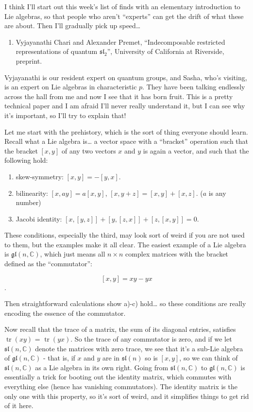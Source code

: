 \documentclass{article}
\def\tightlist{}
\begin{document}
I think I'll start out this week's list of finds with an elementary
introduction to Lie algebras, so that people who aren't ``experts'' can
get the drift of what these are about. Then I'll gradually pick up
speed\ldots{}

\begin{enumerate}
\def\labelenumi{\arabic{enumi})}
\tightlist
\item
  Vyjayanathi Chari and Alexander Premet, ``Indecomposable restricted
  representations of quantum \(\mathfrak{sl}_2\)'', University of
  California at Riverside, preprint.
\end{enumerate}

Vyjayanathi is our resident expert on quantum groups, and Sasha, who's
visiting, is an expert on Lie algebras in characteristic \(p\). They
have been talking endlessly across the hall from me and now I see that
it has born fruit. This is a pretty technical paper and I am afraid I'll
never really understand it, but I can see why it's important, so I'll
try to explain that!

Let me start with the prehistory, which is the sort of thing everyone
should learn. Recall what a Lie algebra is\ldots{} a vector space with a
``bracket'' operation such that the bracket \([x,y]\) of any two vectors
\(x\) and \(y\) is again a vector, and such that the following hold:

\begin{enumerate}
\def\labelenumi{\alph{enumi})}
\tightlist
\item
  skew-symmetry: \([x,y] = -[y,x]\).
\item
  bilinearity: \([x,ay] = a[x,y]\), \([x,y+z] = [x,y] + [x,z]\). (\(a\)
  is any number)
\item
  Jacobi identity: \([x,[y,z]] + [y,[z,x]] + [z,[x,y]] = 0\).
\end{enumerate}

These conditions, especially the third, may look sort of weird if you
are not used to them, but the examples make it all clear. The easiest
example of a Lie algebra is \(\mathfrak{gl}(n,\mathbb{C})\), which just
means all \(n\times n\) complex matrices with the bracket defined as the
``commutator'':

\[[x,y] = xy - yx\].

Then straightforward calculations show a)-c) hold\ldots{} so these
conditions are really encoding the essence of the commutator.

Now recall that the trace of a matrix, the sum of its diagonal entries,
satisfies \(\operatorname{tr}(xy)\) = \(\operatorname{tr}(yx)\). So the
trace of any commutator is zero, and if we let
\(\mathfrak{sl}(n,\mathbb{C})\) denote the matrices with zero trace, we
see that it's a sub-Lie algebra of \(\mathfrak{gl}(n,\mathbb{C})\) -
that is, if \(x\) and \(y\) are in \(\mathfrak{sl}(n)\) so is \([x,y]\),
so we can think of \(\mathfrak{sl}(n,\mathbb{C})\) as a Lie algebra in
its own right. Going from \(\mathfrak{sl}(n,\mathbb{C})\) to
\(\mathfrak{gl}(n,\mathbb{C})\) is essentially a trick for booting out
the identity matrix, which commutes with everything else (hence has
vanishing commutators). The identity matrix is the only one with this
property, so it's sort of weird, and it simplifies things to get rid of
it here.
\end{document}
